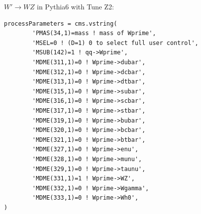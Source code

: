 $W' \to WZ$ in Pythia6 with Tune Z2:
\begin{verbatim}
processParameters = cms.vstring(
        'PMAS(34,1)=mass ! mass of Wprime',
        'MSEL=0 ! (D=1) 0 to select full user control',
        'MSUB(142)=1 ! qq->Wprime',
        'MDME(311,1)=0 ! Wprime->dubar',   
        'MDME(312,1)=0 ! Wprime->dcbar',
        'MDME(313,1)=0 ! Wprime->dtbar',
        'MDME(315,1)=0 ! Wprime->subar',       
        'MDME(316,1)=0 ! Wprime->scbar',
        'MDME(317,1)=0 ! Wprime->stbar',
        'MDME(319,1)=0 ! Wprime->bubar',      
        'MDME(320,1)=0 ! Wprime->bcbar',
        'MDME(321,1)=0 ! Wprime->btbar',
        'MDME(327,1)=0 ! Wprime->enu',     
        'MDME(328,1)=0 ! Wprime->munu',
        'MDME(329,1)=0 ! Wprime->taunu',
        'MDME(331,1)=1 ! Wprime->WZ',
        'MDME(332,1)=0 ! Wprime->Wgamma',
        'MDME(333,1)=0 ! Wprime->Wh0',
)
\end{verbatim}






\clearpage

